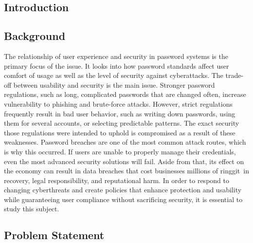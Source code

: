 \documentclass[12pt,a4paper]{article}
\begin{document}

\newpage

\tableofcontents

\newpage




\begin{justify}


\section{Introduction}

\subsection{Background}

The relationship of user experience and security in password systems is the primary focus of the issue. 
It looks into how password standards affect user comfort of usage as well as the level of security against cyberattacks. 
The trade-off between usability and security is the main issue. 
Stronger password regulations, such as long, complicated passwords that are changed often, increase vulnerability to phishing and brute-force attacks. 
However, strict regulations frequently result in bad user behavior, such as writing down passwords, using them for several accounts, or selecting predictable patterns. 
The exact security those regulations were intended to uphold is compromised as a result of these weaknesses. Password breaches are one of the most common attack routes, which is why this occurred. 
If users are unable to properly manage their credentials, even the most advanced security solutions will fail.
Aside from that, its effect on the economy can result in data breaches that cost businesses millions of ringgit in recovery, legal responsibility, and reputational harm.  
In order to respond to changing cyberthreats and create policies that enhance protection and usability while guaranteeing user compliance without sacrificing security, it is essential to study this subject.

\subsection{Problem Statement}


\end{justify}
\end{document}
